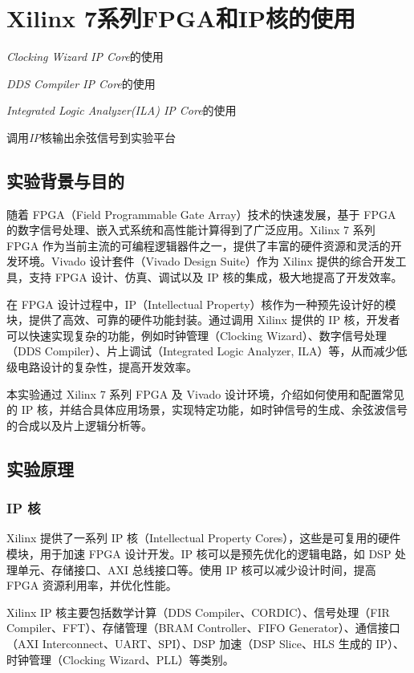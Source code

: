 
\chapter{Xilinx 7系列FPGA和IP核的使用}
\begin{introduction}
  \item \textit{Clocking Wizard IP Core}的使用
  \item \textit{DDS Compiler IP Core}的使用
  \item \textit{Integrated Logic Analyzer(ILA) IP Core}的使用
  \item 调用\textit{IP}核输出余弦信号到实验平台
\end{introduction}
\section{实验背景与目的}
随着 FPGA（Field Programmable Gate Array）技术的快速发展，基于 FPGA 的数字信号处理、嵌入式系统和高性能计算得到了广泛应用。Xilinx 7 系列 FPGA 作为当前主流的可编程逻辑器件之一，提供了丰富的硬件资源和灵活的开发环境。Vivado 设计套件（Vivado Design Suite）作为 Xilinx 提供的综合开发工具，支持 FPGA 设计、仿真、调试以及 IP 核的集成，极大地提高了开发效率。

在 FPGA 设计过程中，IP（Intellectual Property）核作为一种预先设计好的模块，提供了高效、可靠的硬件功能封装。通过调用 Xilinx 提供的 IP 核，开发者可以快速实现复杂的功能，例如时钟管理（Clocking Wizard）、数字信号处理（DDS Compiler）、片上调试（Integrated Logic Analyzer, ILA）等，从而减少低级电路设计的复杂性，提高开发效率。

本实验通过 Xilinx 7 系列 FPGA 及 Vivado 设计环境，介绍如何使用和配置常见的 IP 核，并结合具体应用场景，实现特定功能，如时钟信号的生成、余弦波信号的合成以及片上逻辑分析等。

\section{实验原理}
\subsection{IP 核}
\begin{definition}[IP核]
  Xilinx 提供了一系列 IP 核（Intellectual Property Cores），这些是可复用的硬件模块，用于加速 FPGA 设计开发。IP 核可以是预先优化的逻辑电路，如 DSP 处理单元、存储接口、AXI 总线接口等。使用 IP 核可以减少设计时间，提高 FPGA 资源利用率，并优化性能。
\end{definition}


Xilinx IP 核主要包括数学计算（DDS Compiler、CORDIC）、信号处理（FIR Compiler、FFT）、存储管理（BRAM Controller、FIFO Generator）、通信接口（AXI Interconnect、UART、SPI）、DSP 加速（DSP Slice、HLS 生成的 IP）、时钟管理（Clocking Wizard、PLL）等类别。

